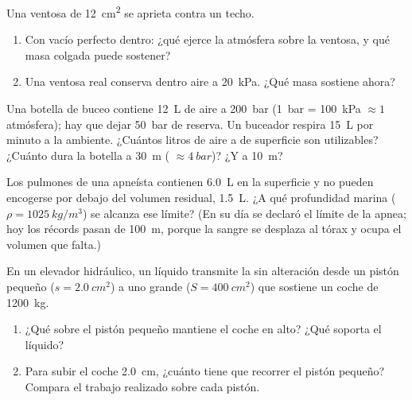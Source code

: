 \begin{exercise}[$\star\star\star$]\label{exo:g10:pressure:12}
Una ventosa de \qty{12}{cm^2} se aprieta contra un techo.
\begin{enumerate}
  \item Con vacío perfecto dentro: ¿qué  ejerce la atmósfera sobre
        la ventosa, y qué masa colgada puede sostener?
  \item Una ventosa real conserva dentro aire a \qty{20}{kPa}. ¿Qué masa
        sostiene ahora?
\end{enumerate}
\end{exercise}

\begin{exercise}[$\star\star\star$]\label{exo:g10:pressure:13}
Una botella de buceo contiene \qty{12}{L} de aire a \qty{200}{bar}
(\qty{1}{bar} = \qty{100}{kPa} $\approx 1$ atmósfera); hay que dejar
\qty{50}{bar} de reserva. Un buceador respira \qty{15}{L} por minuto a
la  ambiente. ¿Cuántos litros de aire a  de superficie son
utilizables? ¿Cuánto dura la botella a \qty{30}{m} (
$\approx \qty{4}{bar}$)? ¿Y a \qty{10}{m}?
\end{exercise}

\begin{exercise}[$\star\star\star$]\label{exo:g10:pressure:14}
Los pulmones de una apneísta contienen \qty{6.0}{L} en la superficie y
no pueden encogerse por debajo del volumen residual, \qty{1.5}{L}. ¿A
qué profundidad marina ($\rho = \qty{1025}{kg/m^3}$) se alcanza ese
límite? (En su día se declaró el límite de la apnea; hoy los récords
pasan de \qty{100}{m}, porque la sangre se desplaza al tórax y ocupa el
volumen que falta.)
\end{exercise}

\begin{exercise}[$\star\star\star$]\label{exo:g10:pressure:15}
En un elevador hidráulico, un líquido transmite la  sin
alteración desde un pistón pequeño ($s = \qty{2.0}{cm^2}$) a uno grande
($S = \qty{400}{cm^2}$) que sostiene un coche de \qty{1200}{kg}.
\begin{enumerate}
  \item ¿Qué  sobre el pistón pequeño mantiene el coche en alto?
        ¿Qué  soporta el líquido?
  \item Para subir el coche \qty{2.0}{cm}, ¿cuánto tiene que recorrer el
        pistón pequeño? Compara el trabajo realizado sobre cada pistón.
\end{enumerate}
\end{exercise}

